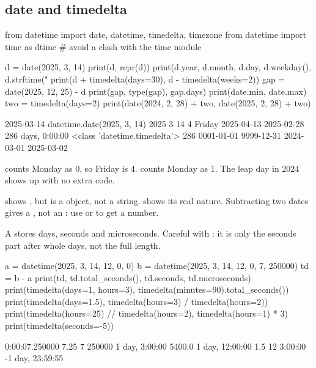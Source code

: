 \subsection{date and timedelta}

\begin{pycode}
from datetime import date, datetime, timedelta, timezone
from datetime import time as dtime   # avoid a clash with the time module

d = date(2025, 3, 14)
print(d, repr(d))
print(d.year, d.month, d.day, d.weekday(), d.strftime("%
print(d + timedelta(days=30), d - timedelta(weeks=2))
gap = date(2025, 12, 25) - d
print(gap, type(gap), gap.days)
print(date.min, date.max)
two = timedelta(days=2)
print(date(2024, 2, 28) + two, date(2025, 2, 28) + two)
\end{pycode}
\begin{rawcode}
2025-03-14 datetime.date(2025, 3, 14)
2025 3 14 4 Friday
2025-04-13 2025-02-28
286 days, 0:00:00 <class 'datetime.timedelta'> 286
0001-01-01 9999-12-31
2024-03-01 2025-03-02
\end{rawcode}

 counts Monday as 0, so Friday is 4.  counts Monday as 1. The
leap day in 2024 shows up with no extra code.

\begin{typecheck}
 shows , but  is a  object, not a string.
 shows its real nature. Subtracting two dates gives a , not an
: use  or  to get a number.
\end{typecheck}

A  stores days, seconds and microseconds. Careful with : it is only
the seconds part after whole days, not the full length.

\begin{pycode}
a = datetime(2025, 3, 14, 12, 0, 0)
b = datetime(2025, 3, 14, 12, 0, 7, 250000)
td = b - a
print(td, td.total_seconds(), td.seconds, td.microseconds)
print(timedelta(days=1, hours=3), timedelta(minutes=90).total_seconds())
print(timedelta(days=1.5), timedelta(hours=3) / timedelta(hours=2))
print(timedelta(hours=25) // timedelta(hours=2), timedelta(hours=1) * 3)
print(timedelta(seconds=-5))
\end{pycode}
\begin{rawcode}
0:00:07.250000 7.25 7 250000
1 day, 3:00:00 5400.0
1 day, 12:00:00 1.5
12 3:00:00
-1 day, 23:59:55
\end{rawcode}

